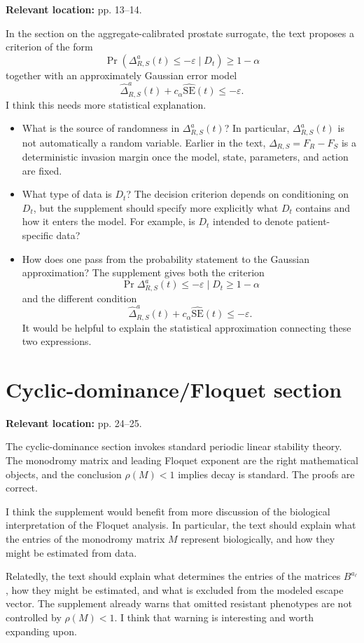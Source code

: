 \documentclass[11pt]{article}
\begin{document}
\textbf{Relevant location:} pp. 13–14.

In the section on the aggregate-calibrated prostate surrogate, the text proposes a criterion of the form
\[
\Pr(\Delta^a_{R,S}(t)\leq -\varepsilon\mid D_t)\geq 1-\alpha
\]
together with an approximately Gaussian error model
\[
\widehat\Delta^a_{R,S}(t)+c_\alpha\widehat{\mathrm{SE}}(t)\leq -\varepsilon.
\]
I think this needs more statistical explanation.

\begin{itemize}[leftmargin=*]
\item What is the source of randomness in $\Delta^a_{R,S}(t)$? In particular, $\Delta^a_{R,S}(t)$ is not automatically a random variable. Earlier in the text, $\Delta_{R,S}=F_R-F_S$ is a deterministic invasion margin once the model, state, parameters, and action are fixed.

\item What type of data is $D_t$? The decision criterion depends on conditioning on $D_t$, but the supplement should specify more explicitly what $D_t$ contains and how it enters the model. For example, is $D_t$ intended to denote patient-specific data?

\item How does one pass from the probability statement to the Gaussian approximation? The supplement gives both the criterion
\[
\Pr{\Delta^a_{R,S}(t)\leq -\varepsilon\mid D_t}\geq 1-\alpha
\]
and the different condition
\[
\widehat\Delta^a_{R,S}(t)+c_\alpha\widehat{\mathrm{SE}}(t)\leq -\varepsilon.
\]
It would be helpful to explain the statistical approximation connecting these two expressions.
\end{itemize}

\section{Cyclic-dominance/Floquet section}

\textbf{Relevant location:} pp. 24–25.

The cyclic-dominance section invokes standard periodic linear stability theory. The monodromy matrix and leading Floquet exponent are the right mathematical objects, and the conclusion $\rho(M)<1$ implies decay is standard. The proofs are correct.

I think the supplement would benefit from more discussion of the biological interpretation of the Floquet analysis. In particular, the text should explain what the entries of the monodromy matrix $M$ represent biologically, and how they might be estimated from data.

Relatedly, the text should explain what determines the entries of the matrices $B^{a_\ell}$, how they might be estimated, and what is excluded from the modeled escape vector. The supplement already warns that omitted resistant phenotypes are not controlled by $\rho(M)<1$. I think that warning is interesting and worth expanding upon.
\end{document}

